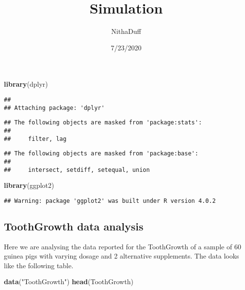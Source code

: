 \documentclass[
]{article}
\title{Simulation}
\author{NithaDuff}
\date{7/23/2020}
\newenvironment{Shaded}{\begin{snugshade}}{\end{snugshade}}
\newcommand{\KeywordTok}[1]{\textcolor[rgb]{0.13,0.29,0.53}{\textbf{#1}}}
\newcommand{\NormalTok}[1]{#1}
\newcommand{\StringTok}[1]{\textcolor[rgb]{0.31,0.60,0.02}{#1}}
\begin{document}
\maketitle

\begin{Shaded}
\begin{Highlighting}[]
\KeywordTok{library}\NormalTok{(dplyr)}
\end{Highlighting}
\end{Shaded}

\begin{verbatim}
## 
## Attaching package: 'dplyr'
\end{verbatim}

\begin{verbatim}
## The following objects are masked from 'package:stats':
## 
##     filter, lag
\end{verbatim}

\begin{verbatim}
## The following objects are masked from 'package:base':
## 
##     intersect, setdiff, setequal, union
\end{verbatim}

\begin{Shaded}
\begin{Highlighting}[]
\KeywordTok{library}\NormalTok{(ggplot2)}
\end{Highlighting}
\end{Shaded}

\begin{verbatim}
## Warning: package 'ggplot2' was built under R version 4.0.2
\end{verbatim}

\hypertarget{toothgrowth-data-analysis}{%
\subsection{ToothGrowth data analysis}\label{toothgrowth-data-analysis}}

Here we are analysing the data reported for the ToothGrowth of a sample
of 60 guinea pigs with varying dosage and 2 alternative supplements. The
data looks like the following table.

\begin{Shaded}
\begin{Highlighting}[]
\KeywordTok{data}\NormalTok{(}\StringTok{"ToothGrowth"}\NormalTok{)}
\KeywordTok{head}\NormalTok{(ToothGrowth)}
\end{Highlighting}
\end{Shaded}
\end{document}
